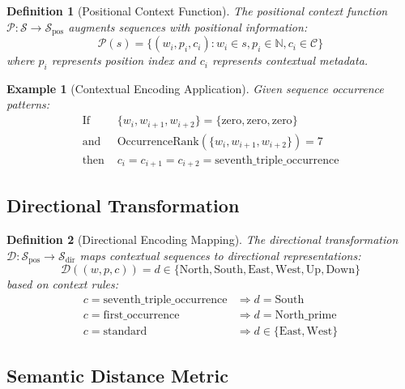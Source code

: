 \documentclass[12pt,a4paper]{article}
\newtheorem{definition}{Definition}
\newtheorem{example}{Example}
\begin{document}
\begin{definition}[Positional Context Function]
The positional context function $\mathcal{P}: \mathcal{S} \to \mathcal{S}_{\text{pos}}$ augments sequences with positional information:
\begin{equation}
\mathcal{P}(s) = \{(w_i, p_i, c_i) : w_i \in s, p_i \in \mathbb{N}, c_i \in \mathcal{C}\}
\end{equation}
where $p_i$ represents position index and $c_i$ represents contextual metadata.
\end{definition}

\begin{example}[Contextual Encoding Application]
Given sequence occurrence patterns:
\begin{align}
\text{If } &\{w_i, w_{i+1}, w_{i+2}\} = \{\text{zero}, \text{zero}, \text{zero}\} \\
\text{and } &\text{OccurrenceRank}(\{w_i, w_{i+1}, w_{i+2}\}) = 7 \\
\text{then } &c_i = c_{i+1} = c_{i+2} = \text{seventh\_triple\_occurrence}
\end{align}
\end{example}

\subsection{Directional Transformation}

\begin{definition}[Directional Encoding Mapping]
The directional transformation $\mathcal{D}: \mathcal{S}_{\text{pos}} \to \mathcal{S}_{\text{dir}}$ maps contextual sequences to directional representations:
\begin{equation}
\mathcal{D}((w, p, c)) = d \in \{\text{North}, \text{South}, \text{East}, \text{West}, \text{Up}, \text{Down}\}
\end{equation}
based on context rules:
\begin{align}
c = \text{seventh\_triple\_occurrence} &\Rightarrow d = \text{South} \\
c = \text{first\_occurrence} &\Rightarrow d = \text{North\_prime} \\
c = \text{standard} &\Rightarrow d \in \{\text{East}, \text{West}\}
\end{align}
\end{definition}

\subsection{Semantic Distance Metric}
\end{document}
